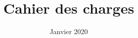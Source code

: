 \documentclass[a4paper, 11pt]{article}
\title{\Huge Cahier des charges}
\date{Janvier 2020}
\begin{document}
\maketitle
\pagebreak

\begingroup
  \flushbottom
  \setlength{\parskip}{0pt plus 1fil}%
  \renewcommand{\contentsname}{\huge\textsc{Table des matières\newline}}
  \tableofcontents
  \newpage
\endgroup







\end{document}
